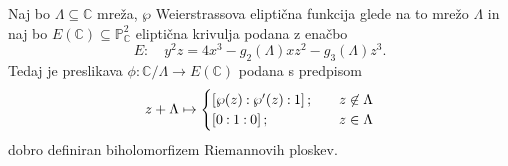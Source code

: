 \documentclass[mat1]{fmfdelo}
\numberwithin{equation}{section}
\newcommand{\C}{\mathbb C}
\newcommand{\PC}{\mathbb{P}^2_\C}
\newcommand{\oio}{\pcoor{0: 1 : 0}}
\newcommand{\torus}{\C/\Lambda}
\newcommand{\pcoor}[1]{%
\begingroup\lccode`~=`: \lowercase{\endgroup
\edef~}{\mathbin{\mathchar\the\mathcode`:}\nobreak}%
\left[%
\begingroup
\mathcode`:=\string"8000
#1%
\endgroup
\right]%
}
\theoremstyle{definition}
\begin{document}
\begin{izrek}
    \label{izomorfizem torusa in krivulje}
    Naj bo $\Lambda \subseteq \C$ mreža, $\wp$ Weierstrassova eliptična funkcija glede na to mrežo $\Lambda$ in naj bo $E(\C)\subseteq \PC$ eliptična krivulja podana z enačbo
    \[
        E: \quad y^2z = 4x^3 - g_2(\Lambda)xz^2 - g_3(\Lambda)z^3.  
    \]
    Tedaj je preslikava $\phi : \torus \to E(\C)$ podana s predpisom
    \[
        z + \Lambda \mapsto 
        \begin{cases}
            \pcoor{\wp(z) : \wp'(z) : 1}; \quad &z \not\in \Lambda \\
            \oio; \quad &z \in \Lambda
        \end{cases}  
    \]
    dobro definiran biholomorfizem Riemannovih ploskev.
\end{izrek}
\end{document}
